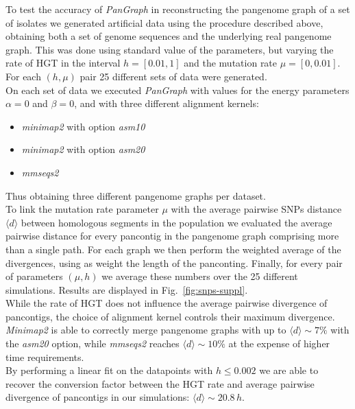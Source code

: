 \documentclass[aps,rmp,reprint,superscriptaddress,notitlepage,10pt,onecolumn]{revtex4-1}
\newcommand{\avg}[1]{\langle #1 \rangle}
\begin{document}
To test the accuracy of \textit{PanGraph} in reconstructing the pangenome graph of a set of isolates we generated artificial data using the procedure described above, obtaining both a set of genome sequences and the underlying real pangenome graph. This was done using standard value of the parameters, but varying the rate of HGT in the interval $h=[0.01,1]$ and the mutation rate $\mu=[0,0.01]$. For each $(h,\mu)$ pair 25 different sets of data were generated.\\
On each set of data we executed \textit{PanGraph} with values for the energy parameters $\alpha=0$ and $\beta=0$, and with three different alignment kernels:
\begin{itemize}
    \item \textit{minimap2} with option \textit{asm10}
    \item \textit{minimap2} with option \textit{asm20}
    \item \textit{mmseqs2}
\end{itemize}
Thus obtaining three different pangenome graphs per dataset.\\
To link the mutation rate parameter $\mu$ with the average pairwise SNPs distance $\avg{d}$ between homologous segments in the population we evaluated the average pairwise distance for every pancontig in the pangenome graph comprising more than a single path. For each graph we then perform the weighted average of the divergences, using as weight the length of the panconting. Finally, for every pair of parameters $(\mu,h)$ we average these numbers over the 25 different simulations. Results are displayed in Fig.~\ref{fig:snps-suppl}.\\
While the rate of HGT does not influence the average pairwise divergence of pancontigs, the choice of alignment kernel controls their maximum divergence. \textit{Minimap2} is able to correctly merge pangenome graphs with up to $\avg{d} \sim 7\%$ with the \textit{asm20} option, while \textit{mmseqs2} reaches $\avg{d} \sim 10\%$ at the expense of higher time requirements.\\
By performing a linear fit on the datapoints with $h \leq 0.002$ we are able to recover the conversion factor between the HGT rate and average pairwise divergence of pancontigs in our simulations: $\avg{d} \sim 20.8 \, h$.
\end{document}
